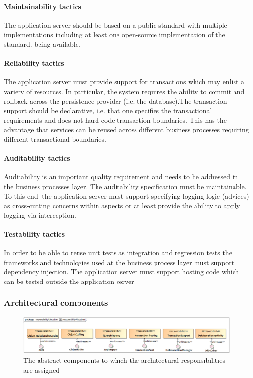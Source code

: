 \documentclass[a4paper,12pt]{report}
\begin{document}
\paragraph {Maintainability tactics}
\hfill \break
The application server should be based on a public standard with multiple implementations including at least one open-source implementation of the standard.
being available.

\paragraph {Reliability tactics}
\hfill \break
The application server must provide support for transactions which may enlist a variety of resources. In particular, the system requires the ability to commit and rollback across the persistence provider (i.e. the database).The transaction support should be declarative, i.e. that one specifies the transactional requirements and does not hard code transaction boundaries. This has the advantage that services can be reused across different business processes requiring different transactional boundaries. 

\paragraph {Auditability tactics}
\hfill \break
Auditability is an important quality requirement and needs to be addressed in the business processes layer. The auditability specification must be maintainable. To this end, the application server must support specifying logging logic (advices) as cross-cutting concerns within aspects or at least provide the ability to apply logging via interception.

\paragraph {Testability tactics }
In order to be able to reuse unit tests as integration and regression tests the frameworks and technologies used at the business process layer must support dependency injection. The application server must support hosting code which can be tested outside the application server

\subsubsection {Architectural components}
	\begin{figure}[htb]
		\centering
		\includegraphics [scale=0.5]{../Diagrams/PersistanceResponsibiltiesAllocationZ.png}
		\caption{The abstract components to which the architectural responsibilities are assigned}
	\end{figure}
\end{document}
